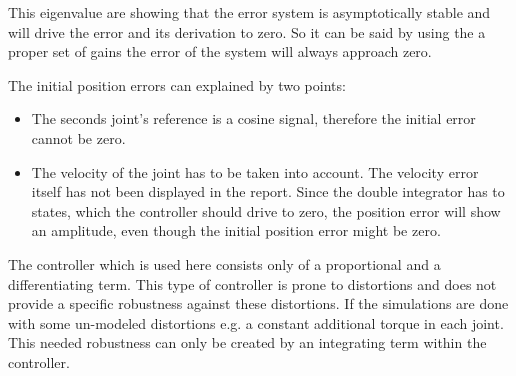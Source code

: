 This eigenvalue are showing that the error system is asymptotically stable and will drive the error and its derivation to zero. So it can be said by using the a proper set of gains the error of the system will always approach zero.

The initial position errors can explained by two points:
\begin{itemize}
	\item The seconds joint's reference is a cosine signal, therefore the initial error cannot be zero.
	\item The velocity of the joint has to be taken into account. The velocity error itself has not been displayed in the report. Since the double integrator has to states, which the controller should drive to zero, the position error will show an amplitude, even though the initial position error might be zero. 
\end{itemize} 

The controller which is used here consists only of a proportional and a differentiating term. This type of controller is prone to distortions and does not provide a specific robustness against these distortions. If the simulations are done with some un-modeled distortions e.g. a constant additional torque in each joint. This needed robustness can only be created by an integrating term within the controller.